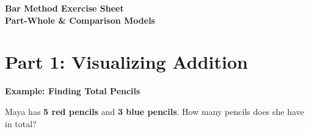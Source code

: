 \documentclass{article}
\begin{document}
\sffamily

\begin{center}
  {\Huge \bfseries Bar Method Exercise Sheet} \\[0.4em]
  {\Large \textbf{Part-Whole \& Comparison Models}}
\end{center}
\vspace{1em}

\section*{Part 1: Visualizing Addition}

{\Large \textbf{Example: Finding Total Pencils}}
\vspace{0.3em}

\noindent Maya has \textbf{5 red pencils} and \textbf{3 blue pencils}. How many pencils does she have in total?
\vspace{0.8em}
\end{document}
